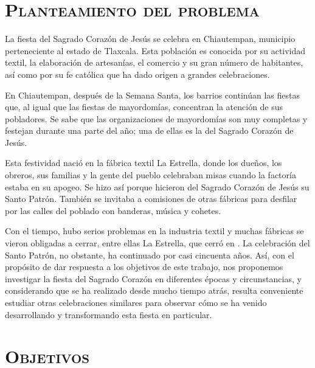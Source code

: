 \documentclass[14pt,letterpaper,twoside]{extbook} %
\begin{document}
\section*{\mdseries\large\textsc{Planteamiento del problema}}

\noindent La fiesta del Sagrado Corazón de Jesús se celebra en Chiautempan, municipio perteneciente al estado de Tlaxcala. Esta población es conocida por su actividad textil, la elaboración de artesanías, el comercio y su gran número de habitantes, así como por su fe católica que ha dado origen a grandes celebraciones.

En Chiautempan, después de la Semana Santa, los barrios continúan las fiestas que, al igual que las fiestas de mayordomías, concentran la atención de sus pobladores. Se sabe que las organizaciones de mayordomías son muy completas y festejan durante una parte del año; una de ellas es la del Sagrado Corazón de Jesús.

Esta festividad nació en la fábrica textil La Estrella, donde los dueños, los obreros, sus familias y la gente del pueblo celebraban misas cuando la factoría estaba en su apogeo. Se hizo así porque hicieron del Sagrado Corazón de Jesús su Santo Patrón. También se invitaba a comisiones de otras fábricas para desfilar por las calles del poblado con banderas, música y cohetes.

Con el tiempo, hubo serios problemas en la industria textil y muchas fábricas se vieron obligadas a cerrar, entre ellas La Estrella, que cerró en . La celebración del Santo Patrón, no obstante, ha continuado por casi cincuenta años. Así, con el propósito de dar respuesta a los objetivos de este trabajo, nos proponemos investigar la fiesta del Sagrado Corazón en diferentes épocas y circunstancias, y considerando que se ha realizado desde mucho tiempo atrás, resulta conveniente estudiar otras celebraciones similares para observar cómo se ha venido desarrollando y transformando esta fiesta en particular.

\section*{\mdseries\large\textsc{Objetivos}}
\end{document}
